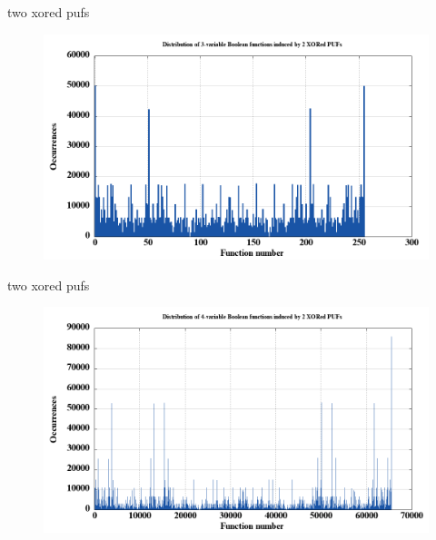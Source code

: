 \documentclass[10pt, compress]{beamer}
\begin{document}
\begin{frame}{two xored pufs}
    \begin{figure}
        \centering
        \includegraphics[width=\textwidth]{figures/dist/distribution_of_3-variable_boolean_functions_induced_by_2_xored_pufs.png}
    \end{figure}
\end{frame}

\begin{frame}{two xored pufs}
    \begin{figure}
        \centering
        \includegraphics[width=\textwidth]{figures/dist/distribution_of_4-variable_boolean_functions_induced_by_2_xored_pufs.png}
    \end{figure}
\end{frame}

\end{document}
